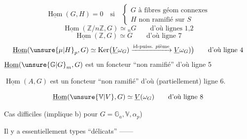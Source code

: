 \[
\underline{\operatorname{Hom}}(G,H)=0\quad\text{si}\quad
\left\{\begin{array}{l}G\text{ à fibres géom connexes}\\H\text{ non ramifié sur }S\end{array}\right.
\]
\[
\underline{\operatorname{Hom}}(\mathbb Z/n\mathbb Z,G)\simeq {}_nG\qquad\text{d'où lignes 1,2}
\]
\[
\underline{\operatorname{Hom}}(\mathbb Z,G)\simeq G\qquad\text{d'où ligne 7}
\]
\[
\underline{\operatorname{Hom}}({\unsure{\mu|H}}_p,G)\simeq\operatorname{Ker}\bigl(\underline V\omega_G)\xrightarrow{\text{id-puiss. }p\text{ième}}\underline V\omega_G)\bigr)\qquad\text{d'où ligne 4}
\]
$\underline{\operatorname{Hom}}({\unsure{\mathbb G|G}}_m,G)$ est un foncteur ``non ramifié'' d'où ligne 5

$\underline{\operatorname{Hom}}(A,G)$ est un foncteur ``non ramifié'' d'où (partiellement) ligne 6.

\[
\underline{\operatorname{Hom}}(\unsure{\mathbb V|V},G)\simeq\underline V(\omega_G)\qquad\text{d'où ligne 8}
\]

Cas difficiles
(implique b) pour $G=\mathbb G_a,\mathbb V,\alpha_p$)

Il y a essentiellement  types ``délicats'' ------
